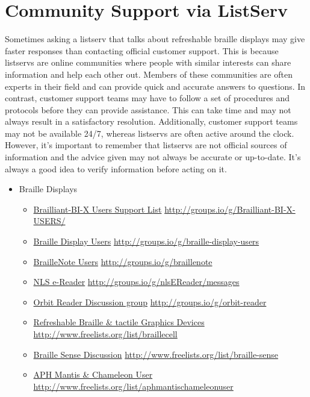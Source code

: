\documentclass[12pt,letterpaper,twoside]{extreport}
\begin{document}
\begin{appendices}
\hypertarget{listserv2}{}\section{Community Support via ListServ}\label{listserv2}
Sometimes asking a listserv that talks about refreshable braille displays may give faster responses than contacting official customer support. This is because listservs are online communities where people with similar interests can share information and help each other out. Members of these communities are often experts in their field and can provide quick and accurate answers to questions. In contrast, customer support teams may have to follow a set of procedures and protocols before they can provide assistance. This can take time and may not always result in a satisfactory resolution. Additionally, customer support teams may not be available 24/7, whereas listservs are often active around the clock. However, it’s important to remember that listservs are not official sources of information and the advice given may not always be accurate or up-to-date. It’s always a good idea to verify information before acting on it.
\begin{itemize}[leftmargin=*]
\item Braille Displays
\begin{itemize}[leftmargin=2em]
\item \href{http://groups.io/g/Brailliant-BI-X-USERS/}{Brailliant-BI-X Users Support List}  \break\url{http://groups.io/g/Brailliant-BI-X-USERS/} 
\item \href{http://groups.io/g/braille-display-users}{Braille Display Users}  \break\url{http://groups.io/g/braille-display-users}
\item \href{http://groups.io/g/braillenote}{BrailleNote Users}  \break\url{http://groups.io/g/braillenote}
\item \href{http://groups.io/g/nlsEReader/messages}{NLS e-Reader}  \break\url{http://groups.io/g/nlsEReader/messages}
\item \href{http://groups.io/g/orbit-reader}{Orbit Reader Discussion group}  \break\url{http://groups.io/g/orbit-reader}
\item \href{http://www.freelists.org/list/braillecell}{Refreshable Braille \& tactile Graphics Devices}  \break\url{http://www.freelists.org/list/braillecell}
\item \href{http://www.freelists.org/list/braille-sense}{Braille Sense Discussion}  \break\url{http://www.freelists.org/list/braille-sense}
\item \href{http://www.freelists.org/list/aphmantischameleonuser}{APH Mantis \& Chameleon User}  \break\url{http://www.freelists.org/list/aphmantischameleonuser}

\end{itemize}
\end{itemize}
\end{appendices}
\end{document}
